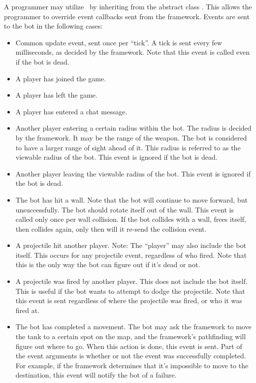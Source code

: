 A programmer may utilize \AI\ by inheriting from the abstract class . This allows the programmer to override event callbacks sent from the framework. Events are sent to the bot in the following cases:
\begin{itemize}
\item Common update event, sent once per ``tick''. A tick is sent every few milliseconds, as decided by the framework. Note that this event is called even if the bot is dead.
\item A player has joined the game.
\item A player has left the game.
\item A player has entered a chat message.
\item Another player entering a certain radius within the bot. The radius is decided by the framework. It may be the range of the weapon. The bot is considered to have a larger range of sight ahead of it. This radius is referred to as the viewable radius of the bot. This event is ignored if the bot is dead.
\item Another player leaving the viewable radius of the bot. This event is ignored if the bot is dead.
\item The bot has hit a wall. Note that the bot will continue to move forward, but unsuccessfully. The bot should rotate itself out of the wall. This event is called only once per wall collision. If the bot collides with a wall, frees itself, then collides again, only then will it re-send the collision event.
\item A projectile hit another player. Note: The ``player'' may also include the bot itself. This occurs for any projectile event, regardless of who fired. Note that this is the only way the bot can figure out if it's dead or not.
\item A projectile was fired by another player. This does not include the bot itself. This is useful if the bot wants to attempt to dodge the projectile. Note that this event is sent regardless of where the projectile was fired, or who it was fired at.
\item The bot has completed a movement. The bot may ask the framework to move the tank to a certain spot on the map, and the framework's pathfinding will figure out where to go. When this action is done, this event is sent. Part of the event arguments is whether or not the event was successfully completed. For example, if the framework determines that it's impossible to move to the destination, this event will notify the bot of a failure.

\end{itemize}
